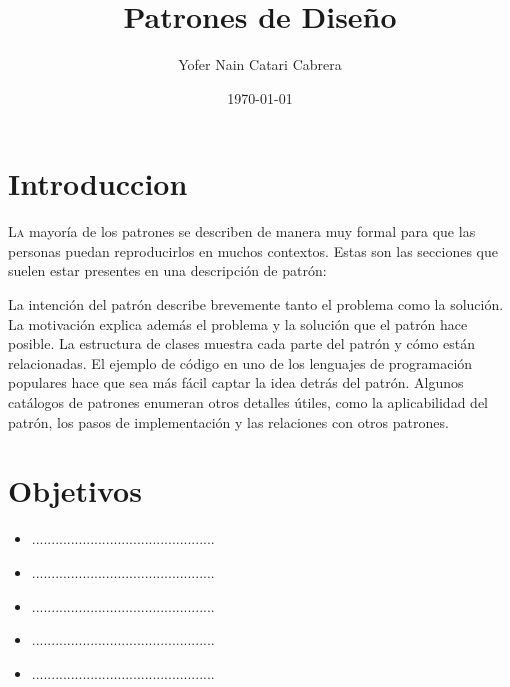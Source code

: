 \documentclass[twoside,twocolumn]{article}
\title{Patrones de Diseño} %
\author{Yofer Nain Catari Cabrera}
\date{\today} %
\begin{document}
\maketitle


\section{Introduccion}

\lettrine[nindent=0em,lines=3]{L}a mayoría de los patrones se describen de manera muy formal para que las personas puedan reproducirlos en muchos contextos. Estas son las secciones que suelen estar presentes en una descripción de patrón:

La intención del patrón describe brevemente tanto el problema como la solución.
La motivación explica además el problema y la solución que el patrón hace posible.
La estructura de clases muestra cada parte del patrón y cómo están relacionadas.
El ejemplo de código en uno de los lenguajes de programación populares hace que sea más fácil captar la idea detrás del patrón.
Algunos catálogos de patrones enumeran otros detalles útiles, como la aplicabilidad del patrón, los pasos de implementación y las relaciones con otros patrones.




\section{Objetivos}

\begin{itemize}
\item ...............................................
\item ...............................................
\item ...............................................
\item ...............................................
\item ...............................................


\end{itemize}
\end{document}
